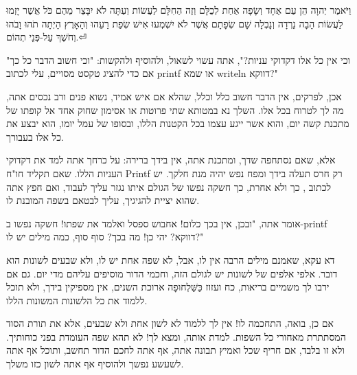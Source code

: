 

\hfill

\begin{minipage}[l]{0.34688\textwidth}
וַיֹּאמֶר יְהוָה הֵן עַם אֶחָד וְשָׂפָה אַחַת לְכֻלָּם וְזֶה הַחִלָּם
לַעֲשׂוֹת וְעַתָּה לֹא יִבָּצֵר מֵהֶם כֹּל אֲשֶׁר יָזְמוּ לַעֲשׂוֹת
הָבָה נֵרְדָה וְנָבְלָה שָׁם שְׂפָתָם אֲשֶׁר לֹא יִשְׁמְעוּ אִישׁ שְׂפַת
רֵעֵהוּ וְהָאָרֶץ הָיְתָה תֹהוּ וָבֹהוּ וְחֹשֶׁךְ עַל-פְּנֵי תְהוֹם.⏎
\end{minipage}

"וכי אין כל אלו דקדוקי עניות?", אתה עשוי לשאול, ולהוסיף ולהקשות: "וכי חשוב הדבר
כל כך אם כדי להציג טקסט מסויים, עלי לכתוב printf או שמא writeln דווקא?"

אכן, לפרקים, אין הדבר חשוב כלל וכלל, שהלא אם איש אמיד, נשוא פנים ורב נכסים אתה,
מה לך לטרוח בכל אלו. השלך נא במטותא שתי פרוטות או אסימון שחוק אחד אל קופתו של
מתכנת קשה יום, והוא אשר ייגע עצמו בכל הקטנות הללו, ובסופו של עמל יומו, הוא יבצע
את כל אלו בעבורך.

אלא, שאם נסתחפה שדך, ומתכנת אתה, אין בידך ברירה: על כרחך אתה למד את דקדוקי
העניות הללו. שאם תקליד חו"ח Printf רק חרס תעלה בידך ומפח נפש יהיה מנת חלקך. יש
לכתוב , כך ולא אחרת, כך חשקה נפשו של הגולם איתו נגזר עליך לעבוד, ואם
חפץ אתה שהוא יציית להגיגיך, עליך לבטאם בשפה המובנת לו.

אומר אתה, "ובכן, אין בכך כלום! אחבוש ספסל ואלמד את שפתו! חשקה נפשו ב-printf
דווקא? יהי כן! מה בכך? סוף סוף, כמה מילים יש לו?"

דא עקא, שאמנם מילים הרבה אין לו, אבל, לא שפה אחת יש לו, ולא שבעים לשונות הוא
דובר. אלפי אלפים של לשונות יש לגולם הזה, וחכמי הדור מוסיפים עליהם מדי יום. גם
אם ירבו לך משמיים בריאות, כח ועזוז כַּשַּׁלְחוּפָה ארוכת השנים, אין מספיקין בידך, ולא
תוכל ללמוד את כל הלשונות המשונות הללו.

אם כן, בואה, התחכמה לו! אין לך ללמוד לא לשון אחת ולא שבעים, אלא את תורת הסוד
המסתתרת מאחורי כל השפות. למדת אותה, ומצא לך! לא תהא שפה העומדת בפני כוחותיך.
ולא זו בלבד, אם חריף שכל ואמיץ תבונה אתה, אף אתה לחכם הדור תחשב, ותוכל אף אתה
לשעשע נפשך ולהוסיף אף אתה לשון כזו משלך.
